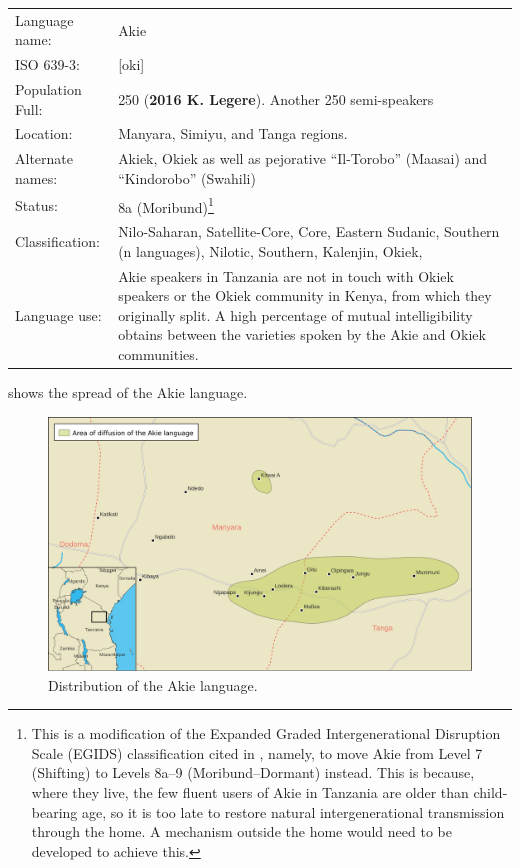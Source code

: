 \documentclass[output=paper,colorlinks,citecolor=brown]{langscibook}
\begin{document}
\ea\begin{tabularx}{\linewidth}[t]{lQ}
Language name: & Akie \\
ISO 639-3: &  	 [oki] \\
Population Full:	&  250 (\textbf{2016 K. Legere}). Another 250 semi-speakers \\
Location:	& 	Manyara, Simiyu, and Tanga regions. \\
Alternate names: & Akiek, Okiek as well as pejorative “Il-Torobo” (Maasai) and “Kindorobo” (Swahili) \\
Status: & 	8a (Moribund)\footnote{This is a modification of the Expanded Graded Intergenerational Disruption Scale (EGIDS) classification cited in \citet[7]{SimonsFennig2018}, namely, to move Akie from Level 7 (Shifting) to Levels 8a–9 (Moribund–Dormant) instead. This is because, where they live, the few fluent users of Akie in Tanzania are older than child-bearing age, so it is too late to restore natural intergenerational transmission through the home. A mechanism outside the home would need to be developed to achieve this. } \\
Classification:	 & Nilo-Saharan, Satellite-Core, Core, Eastern Sudanic, Southern (n languages), Nilotic, Southern, Kalenjin, Okiek, \\
Language use: & 	Akie speakers in Tanzania are not in touch with Okiek speakers or the Okiek community in Kenya, from which they originally split. A high percentage of mutual intelligibility obtains between the varieties spoken by the Akie and Okiek communities. \\
\end{tabularx}
\z

 shows the spread of the Akie language.



\begin{figure}
    \includegraphics[width=\textwidth]{figures/akie_language_map.pdf}
    \caption{Distribution of the Akie language.\label{fig:legere:1}}
\end{figure}
\end{document}
